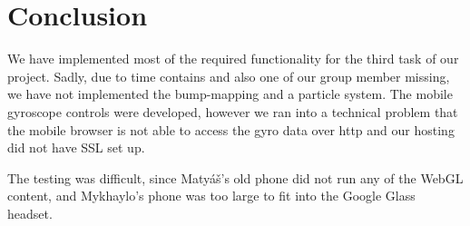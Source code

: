 \documentclass[a4paper,10pt]{article}
\begin{document}
\section*{Conclusion}
We have implemented most of the required functionality for the third task of our project. Sadly, due to time contains and also one of our group member missing, we have not implemented the bump-mapping and a particle system. The mobile gyroscope controls were developed, however we ran into a technical problem that the mobile browser is not able to access the gyro data over http and our hosting did not have SSL set up. 

The testing was difficult, since Matyáš's old phone did not run any of the WebGL content, and Mykhaylo's phone was too large to fit into the Google Glass headset. 
\end{document}
